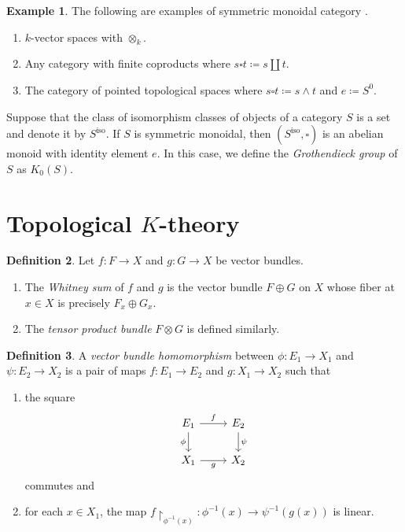 \documentclass[10pt,letterpaper,cm]{nupset}
\theoremstyle{definition}
\newtheorem{definition}{Definition}[section]
\newtheorem{exmp}[definition]{Example}
\theoremstyle{theorem}
\theoremstyle{remark}
\newcommand{\1}{\mathbf{1}}
\newcommand{\0}{\vec 0}
\DeclareMathOperator{\iso}{iso}
\begin{document}
\begin{exmp} The following are examples of symmetric monoidal category	.
\begin{enumerate}
\item $k$-vector spaces with $\otimes_k$.
\item Any category with finite coproducts where $s \square t\coloneqq s \amalg t$.
\item The category of pointed topological spaces where $s \square t \coloneqq s \wedge t $ and $e\coloneqq S^0$.
\end{enumerate} 
\end{exmp}

Suppose that the class of isomorphism classes of objects of a category $S$ is a set and denote it by $S^{\iso}$. If $S$ is symmetric monoidal, then $\left(S^{\iso}, \square\right)$ is an abelian monoid with identity element $e$. In this case, we define the \textit{Grothendieck group} of $S$ as $K_0(S)$.

\section{Topological $K$-theory}

\begin{definition}
Let $f: F \to X$ and $g: G \to X$ be vector bundles. 
\begin{enumerate}
\item The \textit{Whitney sum} of $f$ and $g$ is the vector bundle $F \oplus G$ on $X$ whose fiber at $x \in X$ is precisely $F_x \oplus G_x$.  
\item The \textit{tensor product bundle} $F \otimes G$ is defined similarly.
\end{enumerate}
\end{definition}

\begin{definition}
A \textit{vector bundle homomorphism} between $\phi : E_1 \to X_1$ and $\psi : E_2 \to X_2$ is a pair of maps $f: E_1 \to E_2$ and $g: X_1 \to X_2$ such that
\begin{enumerate}[label=(\roman*)]
\item the square
\[
\begin{tikzcd}
E_1 \arrow[r, "f"] \arrow[d, "\phi"'] & E_2 \arrow[d, "\psi"] \\
X_1 \arrow[r, "g"'] & X_2
\end{tikzcd}
\] commutes and
\item for each $x \in X_1$, the map $f \restriction_{\phi^{{-1}}(x)} : \phi^{{-1}}(x) \to \psi^{{-1}}(g(x))$ is linear.
\end{enumerate}
\end{definition}
\end{document}
